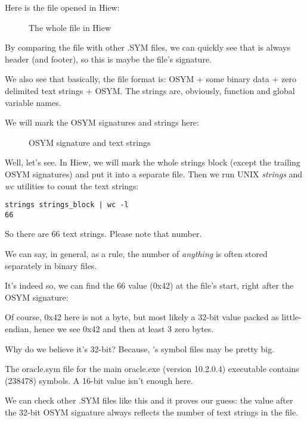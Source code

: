 \clearpage
Here is the file opened in Hiew:

\begin{figure}[H]
\centering
{}
\caption{The whole file in Hiew}
\label{fig:oracle_SYM_whole1}
\end{figure}

By comparing the file with other .SYM files, we can quickly see that  is always header (and footer),
so this is maybe the file's signature.

We also see that basically, the file format is: OSYM + some binary data + zero delimited text strings + OSYM.
The strings are, obviously, function and global variable names.

\clearpage
We will mark the OSYM signatures and strings here: 

\begin{figure}[H]
\centering
{}
\caption{OSYM signature and text strings}
\label{fig:oracle_SYM_whole2}
\end{figure}

Well, let's see. 
In Hiew, we will mark the whole strings block (except the trailing OSYM signatures) and put it into a separate file.
Then we run UNIX \emph{strings} and \emph{wc} utilities to count the text strings:

\begin{lstlisting}
strings strings_block | wc -l
66
\end{lstlisting}

So there are 66 text strings.
Please note that number.

We can say, in general, as a rule, the number of \emph{anything} is often stored separately in binary files.

It's indeed so, we can find the 66 value (0x42) at the file's start, right after the OSYM signature:



Of course, 0x42 here is not a byte, but most likely a 32-bit value packed as little-endian, hence we see
0x42 and then at least 3 zero bytes.

Why do we believe it's 32-bit?
Because, \oracle's symbol 
files may be pretty big.

The oracle.sym file for the main oracle.exe (version 10.2.0.4) executable contains  (238478) symbols.
A 16-bit value isn't enough here.

We can check other .SYM files like this and it proves our guess: the value after the 32-bit OSYM signature always
reflects the number of text strings in the file.

